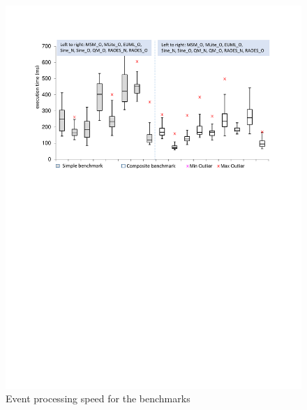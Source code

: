 \begin{figure}
	\centering
	\includegraphics[clip, trim=2.1cm 16.0cm 1.7cm 2.5cm, width=\columnwidth]{experiments/box-plot-mine.pdf}
	\caption{Event processing speed for the benchmarks} 
	\label{fig:boxplot}
\end{figure}


